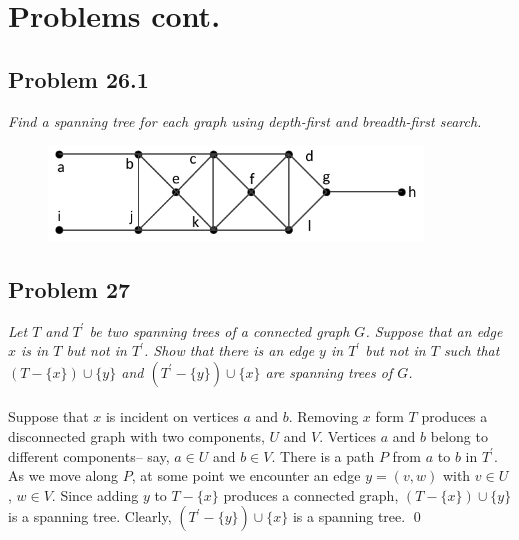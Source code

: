 \documentclass[
        handout,
        ]{beamer}
\begin{document}
\section{Problems cont.}
    \subsection{Problem 26.1}
        \begin{frame}[c]{\subsecname}
            \emph{Find a spanning tree for each graph using depth-first and breadth-first search.}\\
            \begin{figure}
                \centering
                \includegraphics[width=99.6mm]{tut11p23_1_1}
            \end{figure}
        \end{frame}



    \subsection{Problem 27}
        \begin{frame}[c]{\subsecname}
            \emph{Let $T$ and $T^\prime$ be two spanning trees of a connected graph $G$. Suppose that an edge $x$ is in $T$ but not in $T^\prime$. Show that there is an edge $y$ in $T^\prime$ but not in $T$ such that $( T - \{ x \} ) \cup \{ y \} $ and $(T^\prime - \{ y \} ) \cup \{ x \} $ are spanning trees of $G$.}\\$\;$\\\pause
            Suppose that $x$ is incident on vertices $a$ and $b$. Removing $x$ form $T$ produces a disconnected graph with two components, $U$ and $V$. Vertices $a$ and $b$ belong to different components\--- say, $a \in U$ and $b \in V$. There is a path $P$ from $a$ to $b$ in $T^\prime$. As we move along $P$, at some point we encounter an edge $y=(v,w)$ with $v \in U$, $w \in V$. Since adding $y$ to $T-\{x\}$ produces a connected graph, $(T-\{x\}) \cup \{y\}$ is a spanning tree. Clearly, $(T^\prime-\{y\}) \cup \{x\}$ is a spanning tree. \qed
        \end{frame}
    
\end{document}
